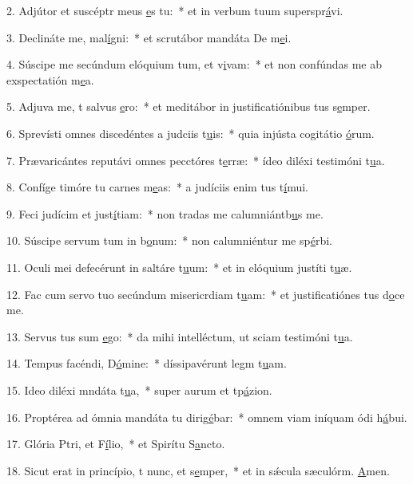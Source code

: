 2. Adjútor et suscéptr meus \uline{e}s tu:~* et in verbum tuum superspr\uline{á}vi.\par 
3. Declináte  me, mal\uline{í}gni:~* et scrutábor mandáta De m\uline{e}i.\par 
4. Súscipe me secúndum elóquium tum, et v\uline{i}vam:~* et non confúndas me ab exspectatión m\uline{e}a.\par 
5. Adjuva me, t salvus \uline{e}ro:~* et meditábor in justificatiónibus tus s\uline{e}mper.\par 
6. Sprevísti omnes discedéntes a judciis t\uline{u}is:~* quia injústa cogitátio \uline{ó}rum.\par 
7. Prævaricántes reputávi omnes pecctóres t\uline{e}rræ:~* ídeo diléxi testimóni t\uline{u}a.\par 
8. Confíge timóre tu carnes m\uline{e}as:~* a judíciis enim tus t\uline{í}mui.\par 
9. Feci judícim et just\uline{í}tiam:~* non tradas me calumniántb\uline{u}s me.\par 
10. Súscipe servum tum in b\uline{o}num:~* non calumniéntur me sp\uline{é}rbi.\par 
11. Oculi mei defecérunt in saltáre t\uline{u}um:~* et in elóquium justíti t\uline{u}æ.\par 
12. Fac cum servo tuo secúndum misericrdiam t\uline{u}am:~* et justificatiónes tus d\uline{o}ce me.\par 
13. Servus tus sum \uline{e}go:~* da mihi intelléctum, ut sciam testimóni t\uline{u}a.\par 
14. Tempus facéndi, D\uline{ó}mine:~* díssipavérunt legm t\uline{u}am.\par 
15. Ideo diléxi mndáta t\uline{u}a,~* super aurum et tp\uline{á}zion.\par 
16. Proptérea ad ómnia mandáta tu dirig\uline{é}bar:~* omnem viam iníquam ódi h\uline{á}bui.\par 
17. Glória Ptri, et F\uline{í}lio,~* et Spirítu S\uline{a}ncto.\par 
18. Sicut erat in princípio, t nunc, et s\uline{e}mper,~* et in sǽcula sæculórm. \uline{A}men.\par 
